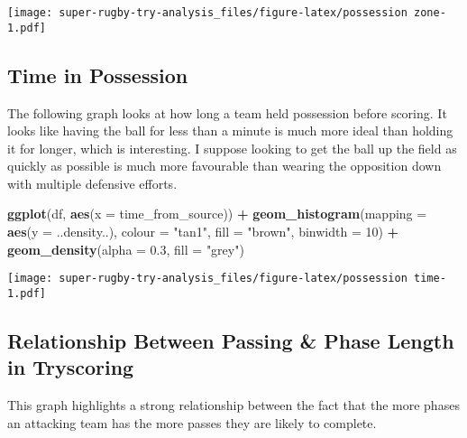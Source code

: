 \documentclass[
]{article}
\newenvironment{Shaded}{\begin{snugshade}}{\end{snugshade}}
\newcommand{\DataTypeTok}[1]{\textcolor[rgb]{0.13,0.29,0.53}{#1}}
\newcommand{\DecValTok}[1]{\textcolor[rgb]{0.00,0.00,0.81}{#1}}
\newcommand{\FloatTok}[1]{\textcolor[rgb]{0.00,0.00,0.81}{#1}}
\newcommand{\KeywordTok}[1]{\textcolor[rgb]{0.13,0.29,0.53}{\textbf{#1}}}
\newcommand{\NormalTok}[1]{#1}
\newcommand{\OperatorTok}[1]{\textcolor[rgb]{0.81,0.36,0.00}{\textbf{#1}}}
\newcommand{\StringTok}[1]{\textcolor[rgb]{0.31,0.60,0.02}{#1}}
\begin{document}
\texttt{[image: super-rugby-try-analysis\_files/figure-latex/possession zone-1.pdf]}

\hypertarget{time-in-possession}{%
\subsection{\texorpdfstring{\textbf{Time in
Possession}}{Time in Possession}}\label{time-in-possession}}

The following graph looks at how long a team held possession before
scoring. It looks like having the ball for less than a minute is much
more ideal than holding it for longer, which is interesting. I suppose
looking to get the ball up the field as quickly as possible is much more
favourable than wearing the opposition down with multiple defensive
efforts.

\begin{Shaded}
\begin{Highlighting}[]
\KeywordTok{ggplot}\NormalTok{(df, }\KeywordTok{aes}\NormalTok{(}\DataTypeTok{x =}\NormalTok{ time_from_source)) }\OperatorTok{+}\StringTok{ }
\StringTok{  }\KeywordTok{geom_histogram}\NormalTok{(}\DataTypeTok{mapping =} \KeywordTok{aes}\NormalTok{(}\DataTypeTok{y =}\NormalTok{ ..density..), }\DataTypeTok{colour =} \StringTok{"tan1"}\NormalTok{, }\DataTypeTok{fill =} \StringTok{"brown"}\NormalTok{, }\DataTypeTok{binwidth =} \DecValTok{10}\NormalTok{) }\OperatorTok{+}
\StringTok{  }\KeywordTok{geom_density}\NormalTok{(}\DataTypeTok{alpha =} \FloatTok{0.3}\NormalTok{, }\DataTypeTok{fill =} \StringTok{"grey"}\NormalTok{)}
\end{Highlighting}
\end{Shaded}

\texttt{[image: super-rugby-try-analysis\_files/figure-latex/possession time-1.pdf]}

\hypertarget{relationship-between-passing-phase-length-in-tryscoring}{%
\subsection{\texorpdfstring{\textbf{Relationship Between Passing \&
Phase Length in
Tryscoring}}{Relationship Between Passing \& Phase Length in Tryscoring}}\label{relationship-between-passing-phase-length-in-tryscoring}}

This graph highlights a strong relationship between the fact that the
more phases an attacking team has the more passes they are likely to
complete.
\end{document}
